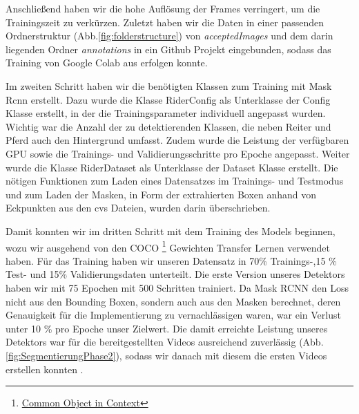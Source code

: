 Anschließend haben wir die hohe Auflösung der Frames verringert, um die Trainingszeit zu verkürzen. Zuletzt haben wir die Daten in einer passenden Ordnerstruktur (Abb.\ref{fig:folderstructure}) von \emph{ acceptedImages} und dem darin liegenden Ordner \emph{annotations} in ein Github Projekt eingebunden, sodass das Training von Google Colab aus erfolgen konnte.

Im zweiten Schritt haben wir die benötigten Klassen zum Training mit Mask Rcnn erstellt. Dazu wurde die Klasse RiderConfig als Unterklasse der Config Klasse erstellt, in der die Trainingsparameter individuell angepasst wurden. Wichtig war die Anzahl der zu detektierenden Klassen, die neben Reiter und Pferd auch den Hintergrund umfasst. Zudem wurde die Leistung der verfügbaren GPU sowie die Trainings- und Validierungsschritte pro Epoche angepasst.  
Weiter wurde die Klasse RiderDataset als Unterklasse der Dataset Klasse erstellt. Die nötigen Funktionen zum Laden eines Datensatzes im Trainings- und Testmodus und zum Laden der Masken, in Form  der extrahierten Boxen anhand von Eckpunkten aus den cvs Dateien, wurden darin überschrieben.

Damit konnten wir im dritten Schritt mit dem Training des Models beginnen, wozu wir ausgehend von den COCO \footnote{\href{http://cocodataset.org/}{Common Object in Context}} Gewichten Transfer Lernen verwendet haben. Für das Training haben wir unseren Datensatz in 70\% Trainings-,15 \% Test- und 15\% Validierungsdaten unterteilt. Die erste Version unseres Detektors haben wir mit 75 Epochen mit 500 Schritten trainiert. Da Mask RCNN den Loss nicht aus den Bounding Boxen, sondern auch aus den Masken berechnet, deren Genauigkeit für die Implementierung zu vernachlässigen waren, war ein Verlust unter 10 \% pro Epoche unser Zielwert. Die damit erreichte Leistung unseres Detektors war für die bereitgestellten Videos ausreichend zuverlässig (Abb. \ref{fig:SegmentierungPhase2}), sodass wir danach mit diesem die ersten Videos erstellen konnten  .

